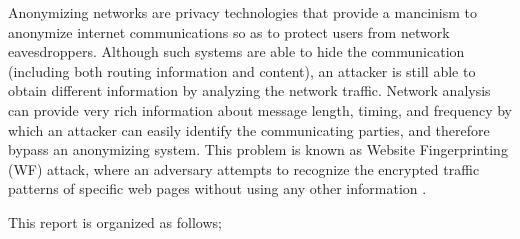 Anonymizing networks are privacy technologies that provide a mancinism to anonymize internet communications so as to protect users from network eavesdroppers. Although such systems are able to hide the communication (including both routing information and content), an attacker is still able to obtain different information by analyzing the network traffic. Network analysis can provide very rich information about message length, timing, and frequency by which an attacker can easily identify the communicating parties, and therefore bypass an anonymizing system. This problem is known as Website Fingerprinting (WF) attack, where an adversary attempts to recognize the encrypted traffic patterns of specific web pages without using any other information \cite{juarez14, murdoch2005low}.




This report is organized as follows; %

